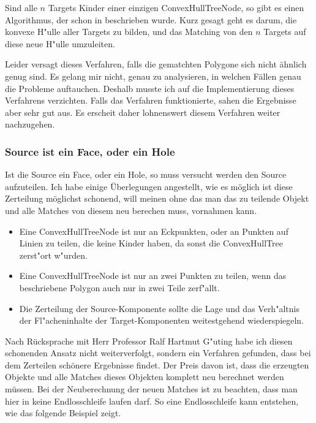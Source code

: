 Sind alle $n$ Targets Kinder einer einzigen ConvexHullTreeNode, so gibt es einen Algorithmus, der schon in \cite{TG} beschrieben wurde. Kurz gesagt geht es darum, die konvexe H"ulle aller Targets zu bilden, und das Matching von den $n$ Targets auf diese neue H"ulle umzuleiten.

Leider versagt dieses Verfahren, falls die gematchten Polygone sich nicht ähnlich genug sind. Es gelang mir nicht, genau zu analysieren, in welchen Fällen genau die Probleme auftauchen. Deshalb musste ich auf die Implementierung dieses Verfahrens verzichten. Falls das Verfahren funktionierte, sahen die Ergebnisse aber sehr gut aus. Es erscheit daher lohnenswert diesem Verfahren weiter nachzugehen.

\subsubsection*{Source ist ein Face, oder ein Hole}

Ist die Source ein Face, oder ein Hole,  so muss versucht werden den Source aufzuteilen. Ich habe einige Überlegungen angestellt, wie es möglich ist diese Zerteilung möglichst schonend, will meinen ohne das man das zu teilende Objekt und alle Matches von diesem neu berechen muss, vornahmen kann.
\begin{itemize}
\item Eine ConvexHullTreeNode ist nur an Eckpunkten, oder an Punkten auf Linien zu teilen, die keine Kinder haben, da sonst die ConvexHullTree zerst"ort w"urden.

\item Eine ConvexHullTreeNode ist nur an zwei Punkten zu teilen, wenn das beschriebene Polygon auch nur in zwei Teile zerf"allt.

\item Die Zerteilung der Source-Komponente sollte die Lage und das Verh"altnis der Fl"acheninhalte der Target-Komponenten weitestgehend wiederspiegeln.

\end{itemize} 

Nach Rücksprache mit Herr Professor Ralf Hartmut G"uting habe ich diesen schonenden Ansatz nicht weiterverfolgt, sondern ein Verfahren gefunden, dass bei dem Zerteilen schönere Ergebnisse findet. Der Preis davon ist, dass die erzeugten Objekte und alle Matches dieses Objekten komplett neu berechnet werden müssen. Bei der Neuberechnung der neuen Matches ist zu beachten, dass man hier in keine Endlosschleife laufen darf. So eine Endlosschleife kann entstehen, wie das folgende Beispiel zeigt.

